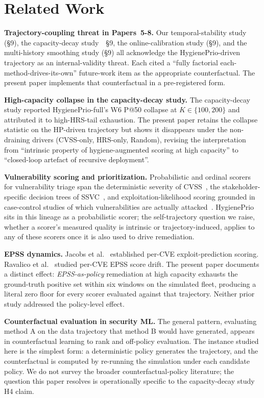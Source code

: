 \section{Related Work}

\textbf{Trajectory-coupling threat in Papers~5-8.}
Our temporal-stability study (§9), the capacity-decay study~\cite{paper6capacity}~§9,
the online-calibration study (§9), and the multi-history smoothing study (§9) all
acknowledge the HygienePrio-driven trajectory as an internal-validity
threat. Each cited a ``fully factorial each-method-drives-its-own''
future-work item as the appropriate counterfactual. The present paper
implements that counterfactual in a pre-registered form.

\textbf{High-capacity collapse in the capacity-decay study.} The capacity-decay study reported
HygienePrio-full's W6 P@50 collapse at $K \in \{100, 200\}$ and
attributed it to high-HRS-tail exhaustion. The present paper retains
the collapse statistic on the HP-driven trajectory but shows it
disappears under the non-draining drivers (CVSS-only, HRS-only,
Random), revising the interpretation from
``intrinsic property of hygiene-augmented scoring at high capacity''
to ``closed-loop artefact of recursive deployment''.

\textbf{Vulnerability scoring and prioritization.} Probabilistic and
ordinal scorers for vulnerability triage span the deterministic severity
of CVSS~\cite{mell2007cvss}, the stakeholder-specific decision trees of
SSVC~\cite{spring2021ssvc}, and exploitation-likelihood scoring grounded
in case-control studies of which vulnerabilities are actually
attacked~\cite{allodi2014comparing}. HygienePrio sits in this lineage as
a probabilistic scorer; the self-trajectory question we raise, whether a
scorer's measured quality is intrinsic or trajectory-induced, applies to
any of these scorers once it is also used to drive remediation.

\textbf{EPSS dynamics.} Jacobs et al.~\cite{jacobs2021epss,jacobs2020improving}
established per-CVE exploit-prediction scoring. Ravalico
et al.~\cite{ravalico2025epsstemporal} studied per-CVE EPSS score drift.
The present paper documents a distinct effect: \textit{EPSS-as-policy}
remediation at high capacity exhausts the ground-truth positive set
within six windows on the simulated fleet, producing a literal zero
floor for every scorer evaluated against that trajectory. Neither prior
study addressed the policy-level effect.

\textbf{Counterfactual evaluation in security ML.} The general pattern,
evaluating method A on the data trajectory that method B would
have generated, appears in counterfactual learning to rank and
off-policy evaluation. The instance studied here is the simplest
form: a deterministic policy generates the trajectory, and the
counterfactual is computed by re-running the simulation under each
candidate policy. We do not survey the broader counterfactual-policy
literature; the question this paper resolves is operationally specific
to the capacity-decay study H4 claim.

